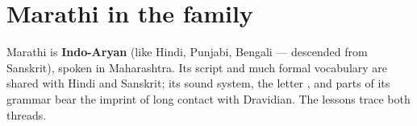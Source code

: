 \section*{Marathi in the family}

Marathi is \textbf{Indo-Aryan} (like Hindi, Punjabi, Bengali — descended from Sanskrit), spoken in Maharashtra. Its script and much formal vocabulary are shared with Hindi and Sanskrit; its sound system, the letter , and parts of its grammar bear the imprint of long contact with Dravidian. The lessons trace both threads.
